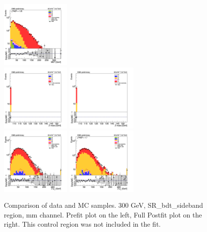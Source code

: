 \begin{figure}[tbp]
\begin{center}
    \includegraphics[width=0.31\textwidth]{figures/mm_300_april18/mm_300_good_SR_bdt_sideBand_april18/met_pt_mm_SR_FullPostfit_plot_apr18.png}\\
    \includegraphics[width=0.31\textwidth]{figures/mm_300_april18/mm_300_good_SR_bdt_sideBand_april18/zmass_high_mm_SR_prefit_plot_apr18.png}
    \includegraphics[width=0.31\textwidth]{figures/mm_300_april18/mm_300_good_SR_bdt_sideBand_april18/zmass_high_mm_SR_FullPostfit_plot_apr18.png}\\
    \includegraphics[width=0.31\textwidth]{figures/mm_300_april18/mm_300_good_SR_bdt_sideBand_april18/zpt0_mm_SR_prefit_plot_apr18.png}
    \includegraphics[width=0.31\textwidth]{figures/mm_300_april18/mm_300_good_SR_bdt_sideBand_april18/zpt0_mm_SR_FullPostfit_plot_apr18.png}\\
    \caption{Comparison of data and MC samples. 300 GeV, SR\_bdt\_sideband region, mm channel. Prefit plot on the left,           Full Postfit plot on the right. This control region was not included in the fit.}
    \label{fig:MCcomparisons_mm_low_SR_bdt_sideband_2}
  \end{center}
\end{figure}



